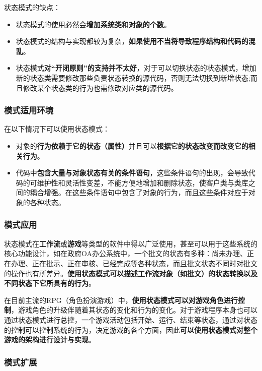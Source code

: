 状态模式的缺点：
\begin{itemize}
    \item 状态模式的使用必然会\textbf{增加系统类和对象的个数}。
    \item 状态模式的结构与实现都较为复杂，\textbf{如果使用不当将导致程序结构和代码的混乱}。
    \item 状态模式\textbf{对“开闭原则”的支持并不太好}，对于可以切换状态的状态模式，增加新的状态类需要修改那些负责状态转换的源代码，否则无法切换到新增状态;而且修改某个状态类的行为也需修改对应类的源代码。
\end{itemize}

\subsubsection{模式适用环境}
在以下情况下可以使用状态模式：
\begin{itemize}
    \item 对象的\textbf{行为依赖于它的状态（属性）}并且可以\textbf{根据它的状态改变而改变它的相关行为}。
    \item 代码中\textbf{包含大量与对象状态有关的条件语句}，这些条件语句的出现，会导致代码的可维护性和灵活性变差，不能方便地增加和删除状态，使客户类与类库之间的耦合增强。在这些条件语句中包含了对象的行为，而且这些条件对应于对象的各种状态。
\end{itemize}

\subsubsection{模式应用}
 状态模式在\textbf{工作流}或\textbf{游戏}等类型的软件中得以广泛使用，甚至可以用于这些系统的核心功能设计，如在政府OA办公系统中，一个批文的状态有多种：尚未办理、正在办理、正在批示、正在审核、已经完成等各种状态，而且批文状态不同时对批文的操作也有所差异。\textbf{使用状态模式可以描述工作流对象（如批文）的状态转换以及不同状态下它所具有的行为}。

 在目前主流的RPG（角色扮演游戏）中，\textbf{使用状态模式可以对游戏角色进行控制}，游戏角色的升级伴随着其状态的变化和行为的变化。对于游戏程序本身也可以通过状态模式进行总控，一个游戏活动包括开始、运行、结束等状态，通过对状态的控制可以控制系统的行为，决定游戏的各个方面，因此\textbf{可以使用状态模式对整个游戏的架构进行设计与实现}。

\subsubsection{模式扩展}

